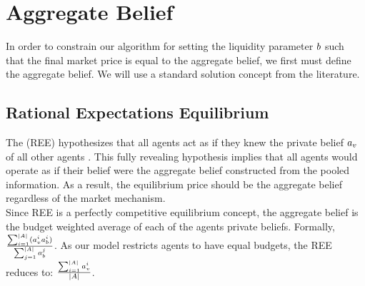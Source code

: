 \section{Aggregate Belief}
In order to constrain our algorithm for setting the liquidity parameter $b$ such that the final market price is equal to the aggregate belief, we first must define the aggregate belief. We will use a standard solution concept from the literature.

\subsection{Rational Expectations Equilibrium}
The  (REE) hypothesizes that all agents act as if they knew the private belief $a_v$ of all other agents \cite{10.2307/1911360}. This fully revealing hypothesis implies that all agents would operate as if their belief were the aggregate belief constructed from the pooled information. As a result, the equilibrium price should be the aggregate belief regardless of the market mechanism.\\

Since REE is a perfectly competitive equilibrium concept, the aggregate belief is the budget weighted average of each of the agents private beliefs. Formally, $\frac{\sum_{i=1}^{|A|} (a^{i}_{v} a^{i}_{b})}{\sum_{j=1}^{|A|} a^{j}_{b}}$. As our model restricts agents to have equal budgets, the REE reduces to: $\frac{\sum_{i=1}^{|A|} a^{i}_{v}}{|A|}$.\\
